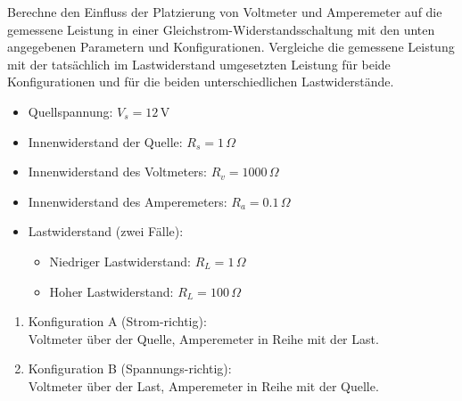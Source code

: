 \documentclass[11pt,a4paper]{article}
\newcounter{exercise}
\newenvironment{exercise}[1][]
  {\refstepcounter{exercise}%
   \begin{tcolorbox}[enhanced, breakable, width=\textwidth,
     colback=blue!5!white,colframe=blue!60!black,
     fonttitle=\bfseries\large,
     title=Aufgabe~\theexercise:~#1]}
  {\end{tcolorbox}}
\begin{document}
\begin{exercise}[Leistungsmessung]
Berechne den Einfluss der Platzierung von Voltmeter und Amperemeter auf die gemessene Leistung in einer Gleichstrom-Widerstandsschaltung mit den unten angegebenen Parametern und Konfigurationen. Vergleiche die gemessene Leistung mit der tatsächlich im Lastwiderstand umgesetzten Leistung für beide Konfigurationen und für die beiden unterschiedlichen Lastwiderstände.

\begin{itemize}
  \item Quellspannung: $V_s = 12\, \mathrm{V}$
  \item Innenwiderstand der Quelle: $R_s = 1\, \Omega$
  \item Innenwiderstand des Voltmeters: $R_v = 1000\, \Omega$
  \item Innenwiderstand des Amperemeters: $R_a = 0.1\, \Omega$
  \item Lastwiderstand (zwei Fälle):
  \begin{itemize}
      \item Niedriger Lastwiderstand: $R_L =  1\, \Omega$
      \item Hoher Lastwiderstand: $R_L = 100\, \Omega$
  \end{itemize}
\end{itemize}

\begin{enumerate}
  \item Konfiguration A (Strom-richtig):\\
  Voltmeter über der Quelle, Amperemeter in Reihe mit der Last.\\

\begin{center}
\end{center}

  \item Konfiguration B (Spannungs-richtig):\\
  Voltmeter über der Last, Amperemeter in Reihe mit der Quelle.\\
\end{enumerate}
\end{exercise}
\end{document}
